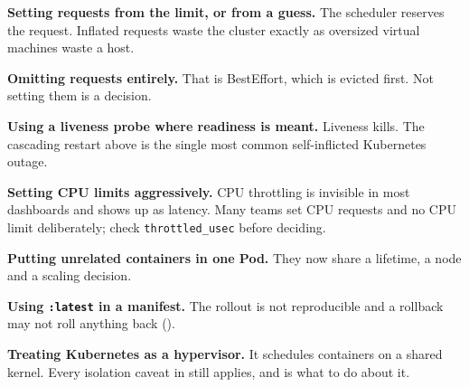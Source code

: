 \begin{pitfall}
\begin{tight}
  \item \textbf{Setting requests from the limit, or from a guess.} The
        scheduler reserves the request. Inflated requests waste the cluster
        exactly as oversized virtual machines waste a host.
  \item \textbf{Omitting requests entirely.} That is BestEffort, which is
        evicted first. Not setting them is a decision.
  \item \textbf{Using a liveness probe where readiness is meant.} Liveness
        kills. The cascading restart above is the single most common
        self-inflicted Kubernetes outage.
  \item \textbf{Setting CPU limits aggressively.} CPU throttling is invisible
        in most dashboards and shows up as latency. Many teams set CPU requests
        and no CPU limit deliberately; check \texttt{throttled\_usec} before
        deciding.
  \item \textbf{Putting unrelated containers in one Pod.} They now share a
        lifetime, a node and a scaling decision.
  \item \textbf{Using \texttt{:latest} in a manifest.} The rollout is not
        reproducible and a rollback may not roll anything back
        ().
  \item \textbf{Treating Kubernetes as a hypervisor.} It schedules containers
        on a shared kernel. Every isolation caveat in  still
        applies, and  is what to do about it.
\end{tight}
\end{pitfall}

